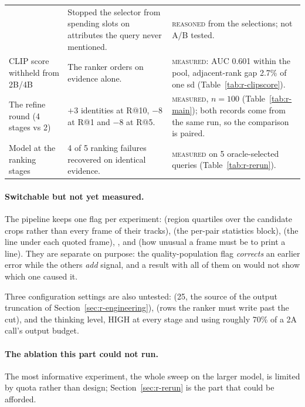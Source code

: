\begin{longtable}{@{}P{4.0cm}P{5.7cm}P{5.4cm}@{}}
& Stopped the selector from spending slots on attributes the query never
  mentioned.
& \textsc{reasoned} from the selections; not A/B tested.\\
\addlinespace
CLIP score withheld from 2B/4B
& The ranker orders on evidence alone.
& \textsc{measured}: AUC 0.601 within the pool, adjacent-rank gap 2.7\% of one
  sd (Table~\ref{tab:r-clipscore}).\\
\addlinespace
The refine round (4 stages vs 2)
& $+3$ identities at R@10, $-8$ at R@1 and $-8$ at R@5.
& \textsc{measured}, $n=100$ (Table~\ref{tab:r-main}); both records come from the
  same run, so the comparison is paired.\\
\addlinespace
Model at the ranking stages
& 4 of 5 ranking failures recovered on identical evidence.
& \textsc{measured} on 5 oracle-selected queries (Table~\ref{tab:r-rerun}).\\
\end{longtable}

\paragraph{Switchable but not yet measured.} The pipeline keeps one flag per
experiment:  (region quartiles over the candidate
crops rather than every frame of their tracks),  (the
per-pair statistics block),  (the  line
under each quoted frame), , and 
(how unusual a frame must be to print a  line). They are separate on
purpose: the quality-population flag \emph{corrects} an earlier error while the
others \emph{add} signal, and a result with all of them on would not show which one
caused it.

{\sloppy Three configuration settings are also untested: 
(25, the source of the output truncation of Section~\ref{sec:r-engineering}),
 (rows the ranker must write past the cut), and the
thinking level, HIGH at every stage and using roughly 70\% of a 2A call's output
budget.\par}

\paragraph{The ablation this part could not run.} The most informative experiment,
the whole sweep on the larger model, is limited by quota rather than design;
Section~\ref{sec:r-rerun} is the part that could be afforded.

